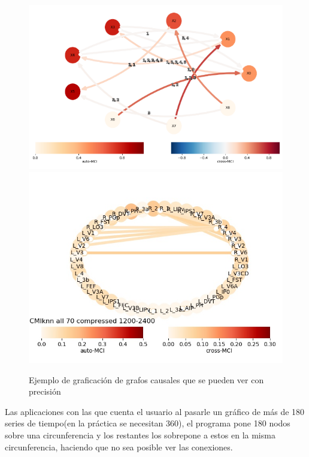 \documentclass[a4paper,10pt,twocolumn]{article}
\begin{document}
\begin{figure}[h!]%
\center
\includegraphics[scale=0.95]{example1.png}
\includegraphics[scale=0.45]{example.png}
\caption{Ejemplo de graficación de grafos causales que se pueden ver con precisión}
\end{figure}

\newpage


Las aplicaciones con las que cuenta el usuario al pasarle un gráfico de más de 180 series de tiempo(en la práctica se necesitan 360), el programa pone 180 nodos sobre una circunferencia y los restantes los sobrepone a estos en la misma circunferencia, haciendo que no sea posible ver las conexiones.\\
\end{document}
